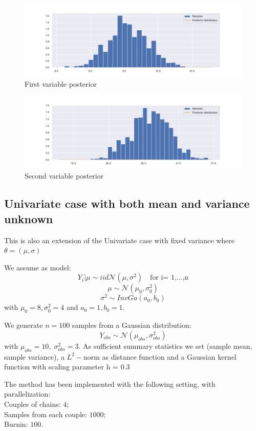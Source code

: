 \documentclass[11pt,a4paper,oneside]{report}
\begin{document}
\begin{figure}[h!]
	\centering
	\includegraphics[width=\textwidth]{immagini_abc_coupling_multivariate/coupling_abc_mult_histogram_1}	
	\caption{First variable posterior}
\end{figure}
\begin{figure}[h!]
	\centering
	\includegraphics[width=\textwidth]{immagini_abc_coupling_multivariate/coupling_abc_mult_histogram_2}	
	\caption{Second variable posterior}
\end{figure}



\subsection{Univariate case with both mean and variance unknown}

This is also an extension of the Univariate case with fixed variance where $\theta = (\mu,\sigma)$

We assume as model:
$$ Y_i | \mu \sim{iid} \mathcal{N}(\mu, \sigma ^2) \quad \text{for i= 1,...,n} $$
$$ \mu  \sim \mathcal{N}(\mu_0, \sigma_0^2)$$
$$ \sigma^2 \sim InvGa(a_0,b_0)
$$
with $\mu_0=8, \sigma_0^2=4$ and $a_0=1, b_0=1$.

We generate $n= 100$ samples from a Gaussian distribution:
$$
Y_{obs} \sim \mathcal{N}(\mu_{obs}, \sigma_{obs} ^2)
$$
with
$
\mu_{obs} = 10, \;
\sigma_{obs} ^2 = 3
$.
As sufficient summary statistics we set (sample mean, sample variance), a $L^2-$norm as distance function and a Gaussian kernel function with scaling parameter h = 0.3 

The method has been implemented with the following setting, with parallelization:\\
Couples of chains: $4$;\\
Samples from each couple: $1000$;\\
Burnin: $100$.
\end{document}
